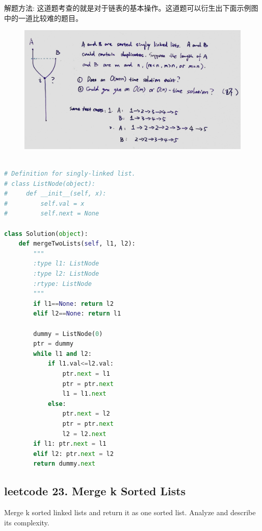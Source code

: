 \documentclass[a4paper,10pt]{article}
\begin{document}
\begin{CJK*}{UTF8}{gbsn}
\noindent 解题方法: 这道题考查的就是对于链表的基本操作。这道题可以衍生出下面示例图中的一道比较难的题目。
\end{CJK*}

\begin{figure}[h]
    \includegraphics[width=1\textwidth]{leetcode21.jpg}
    \centering\\
\end{figure}

\begin{lstlisting}[language=Python, caption=Problem21. Merge Two Sorted Lists]

# Definition for singly-linked list.
# class ListNode(object):
#     def __init__(self, x):
#         self.val = x
#         self.next = None

class Solution(object):
    def mergeTwoLists(self, l1, l2):
        """
        :type l1: ListNode
        :type l2: ListNode
        :rtype: ListNode
        """
        if l1==None: return l2
        elif l2==None: return l1
        
        dummy = ListNode(0)
        ptr = dummy
        while l1 and l2:
            if l1.val<=l2.val:
                ptr.next = l1
                ptr = ptr.next
                l1 = l1.next
            else:
                ptr.next = l2
                ptr = ptr.next
                l2 = l2.next
        if l1: ptr.next = l1
        elif l2: ptr.next = l2
        return dummy.next
\end{lstlisting}





\subsection{leetcode 23. Merge k Sorted Lists}
Merge k sorted linked lists and return it as one sorted list. Analyze and describe its complexity.\\
\end{document}
